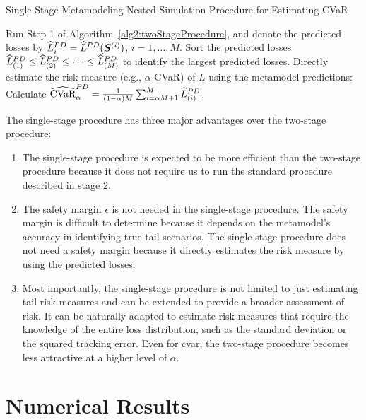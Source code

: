 \begin{algorithm}
\caption{Single-Stage Metamodeling Nested Simulation Procedure for Estimating CVaR}
\begin{algorithmic}[1] \label{alg2:oneStageProcedure}
    \STATE Run Step 1 of Algorithm~\ref{alg2:twoStageProcedure}, and denote the predicted losses by
    $\widehat{L}^{PD}_i = \widehat{L}^{PD}(\bm{S}^{(i)})$, $i=1,\ldots,M$.
    \STATE Sort the predicted losses $\widehat{L}^{PD}_{(1)}\leq \widehat{L}^{PD}_{(2)} \leq \cdots\leq \widehat{L}^{PD}_{(M)}$ to identify the largest predicted losses. 
    \STATE Directly estimate the risk measure (e.g., $\alpha$-CVaR) of $L$ using the metamodel predictions: Calculate $\widehat{\mbox{CVaR}}^{PD}_\alpha = \frac{1}{(1-\alpha)M} \sum_{i=\alpha M + 1}^{M}\widehat{L}^{PD}_{(i)}$.
\end{algorithmic}
\end{algorithm}

The single-stage procedure has three major advantages over the two-stage procedure:
\begin{enumerate}
    \item The single-stage procedure is expected to be more efficient than the two-stage procedure because it does not require us to run the standard procedure described in stage 2.
    \item The safety margin $\epsilon$ is not needed in the single-stage procedure.
    The safety margin is difficult to determine because it depends on the metamodel's accuracy in identifying true tail scenarios.
    The single-stage procedure does not need a safety margin because it directly estimates the risk measure by using the predicted losses.
    \item Most importantly, the single-stage procedure is not limited to just estimating tail risk measures and can be extended to provide a broader assessment of risk. 
    It can be naturally adapted to estimate risk measures that require the knowledge of the entire loss distribution, such as the standard deviation or the squared tracking error.
    Even for \gls{cvar}, the two-stage procedure becomes less attractive at a higher level of $\alpha$.
\end{enumerate}

\section{Numerical Results} \label{sec2:numerical}

